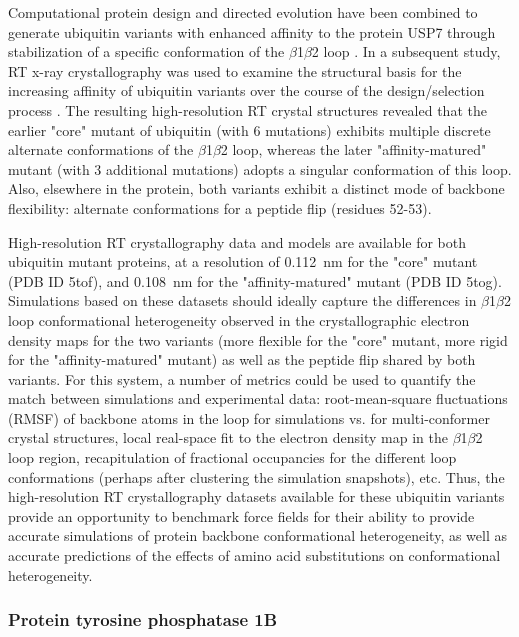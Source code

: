 \documentclass[9pt,review]{livecoms}
\begin{document}
Computational protein design and directed evolution have been combined to generate ubiquitin variants with enhanced affinity to the protein USP7 through stabilization of a specific conformation of the $\beta$1$\beta$2 loop \cite{zhang_conformational_2013}.
In a subsequent study, RT x-ray crystallography was used to examine the structural basis for the increasing affinity of ubiquitin variants over the course of the design/selection process \cite{biel_flexibility_2017}.
The resulting high-resolution RT crystal structures revealed that the earlier "core" mutant of ubiquitin (with 6 mutations) exhibits multiple discrete alternate conformations of the $\beta$1$\beta$2 loop, whereas the later "affinity-matured" mutant (with 3 additional mutations) adopts a singular conformation of this loop.
Also, elsewhere in the protein, both variants exhibit a distinct mode of backbone flexibility: alternate conformations for a peptide flip (residues 52-53).

High-resolution RT crystallography data and models are available for both ubiquitin mutant proteins, at a resolution of \qty{0.112}{\nano\meter} for the "core" mutant (PDB ID 5tof), and \qty{0.108}{\nano\meter} for the "affinity-matured" mutant (PDB ID 5tog).
Simulations based on these datasets should ideally capture the differences in $\beta$1$\beta$2 loop conformational heterogeneity observed in the crystallographic electron density maps for the two variants (more flexible for the "core" mutant, more rigid for the "affinity-matured" mutant) as well as the peptide flip shared by both variants.
For this system, a number of metrics could be used to quantify the match between simulations and experimental data: root-mean-square fluctuations (RMSF) of backbone atoms in the loop for simulations vs. for multi-conformer crystal structures, local real-space fit to the electron density map in the $\beta$1$\beta$2 loop region, recapitulation of fractional occupancies for the different loop conformations (perhaps after clustering the simulation snapshots), etc.
Thus, the high-resolution RT crystallography datasets available for these ubiquitin variants provide an opportunity to benchmark force fields for their ability to provide accurate simulations of protein backbone conformational heterogeneity, as well as accurate predictions of the effects of amino acid substitutions on conformational heterogeneity.

\subsubsection{Protein tyrosine phosphatase 1B}
\label{sub2:ptp1b}
\end{document}
